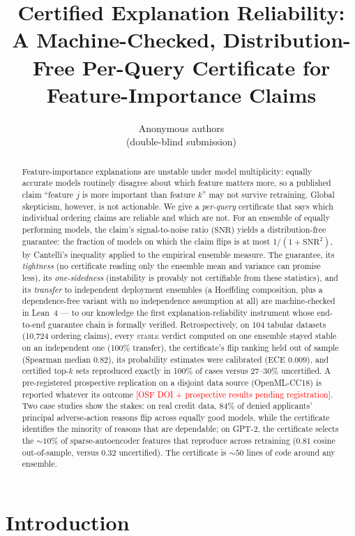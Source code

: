 \documentclass[10pt]{article}
\title{Certified Explanation Reliability:\\ A Machine-Checked, Distribution-Free
Per-Query Certificate for Feature-Importance Claims}
\author{Anonymous authors\\ \small (double-blind submission)}
\date{}
\newcommand{\snr}{\mathrm{SNR}}
\newcommand{\stab}{\textsc{stable}}
\newcommand{\osfpending}{\textcolor{red}{[OSF DOI + prospective results pending registration]}}
\begin{document}
\maketitle

\begin{abstract}
Feature-importance explanations are unstable under model multiplicity: equally accurate
models routinely disagree about which feature matters more, so a published claim
``feature $j$ is more important than feature $k$'' may not survive retraining. Global
skepticism, however, is not actionable. We give a \emph{per-query} certificate that says
which individual ordering claims are reliable and which are not. For an ensemble of
equally performing models, the claim's signal-to-noise ratio ($\snr$) yields a
distribution-free guarantee: the fraction of models on which the claim flips is at most
$1/(1+\snr^2)$, by Cantelli's inequality applied to the empirical ensemble measure. The
guarantee, its \emph{tightness} (no certificate reading only the ensemble mean and
variance can promise less), its \emph{one-sidedness} (instability is provably not
certifiable from these statistics), and its \emph{transfer} to independent deployment
ensembles (a Hoeffding composition, plus a dependence-free variant with no independence
assumption at all) are machine-checked in Lean~4 --- to our knowledge the first
explanation-reliability instrument whose end-to-end guarantee chain is formally
verified. Retrospectively, on
104 tabular datasets (10{,}724 ordering claims), every \stab{} verdict computed on one
ensemble stayed stable on an independent one (100\% transfer), the certificate's flip
ranking held out of sample (Spearman median $0.82$), its probability estimates were
calibrated (ECE $0.009$), and certified top-$k$ sets reproduced exactly in 100\% of cases
versus 27--30\% uncertified. A pre-registered prospective replication on a disjoint data
source (OpenML-CC18) is reported whatever its outcome \osfpending. Two case studies show
the stakes: on real credit data, 84\% of denied applicants' principal adverse-action
reasons flip across equally good models, while the certificate identifies the minority
of reasons that are dependable; on GPT-2, the certificate selects the ${\sim}10\%$ of
sparse-autoencoder features that reproduce across retraining ($0.81$ cosine
out-of-sample, versus $0.32$ uncertified). The certificate is ${\sim}50$ lines of code
around any ensemble.
\end{abstract}

\section{Introduction}
\label{sec:intro}
\end{document}
